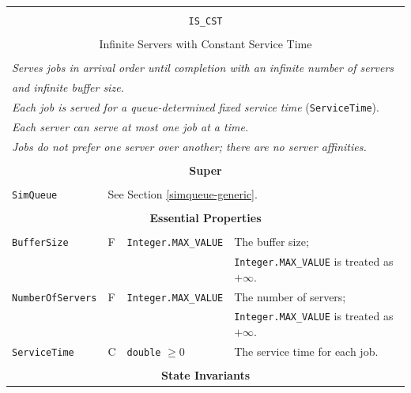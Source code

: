 \documentclass[12pt]{book}
\begin{document}
\begin{tabular}{|l|l|l|l|}
\hline
\multicolumn{4}{|c|}{} \\
\multicolumn{4}{|c|}{\lstinline[basicstyle=\large]{IS_CST}} \\
\multicolumn{4}{|c|}{} \\
\multicolumn{4}{|c|}{Infinite Servers with Constant Service Time} \\
\multicolumn{4}{|c|}{} \\
\hline
\multicolumn{4}{|l|}{\em Serves jobs in arrival order until completion with an infinite number of servers} \\
\multicolumn{4}{|l|}{\em and infinite buffer size.} \\
\multicolumn{4}{|l|}{{\em Each job is served for a queue-determined fixed service time\/} (\lstinline|ServiceTime|).} \\
\multicolumn{4}{|l|}{\em Each server can serve at most one job at a time.} \\
\multicolumn{4}{|l|}{\em Jobs do not prefer one server over another; there are no server affinities.} \\
\hline
\multicolumn{4}{|c|}{} \\
\multicolumn{4}{|c|}{\bf Super} \\
\multicolumn{4}{|c|}{} \\
\hline
\lstinline|SimQueue| & \multicolumn{3}{|l|}{See Section \ref{simqueue-generic}.} \\
\hline
\multicolumn{4}{|c|}{} \\
\multicolumn{4}{|c|}{\bf Essential Properties} \\
\multicolumn{4}{|c|}{} \\
\hline
\lstinline|BufferSize|      & F & \lstinline|Integer.MAX_VALUE|
                            & The buffer size; \\
                        & & & \lstinline|Integer.MAX_VALUE| is treated as $+\infty$. \\
\hline
\lstinline|NumberOfServers| & F & \lstinline|Integer.MAX_VALUE|
                            & The number of servers; \\
                        & & & \lstinline|Integer.MAX_VALUE| is treated as $+\infty$. \\
\hline
\lstinline|ServiceTime|     & C & \lstinline|double| $\geq 0$
                            & The service time for each job. \\
\hline
\multicolumn{4}{|c|}{} \\
\multicolumn{4}{|c|}{\bf State  Invariants} \\

\end{tabular}
\end{document}
